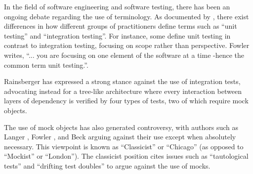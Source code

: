 \documentclass[conference]{IEEEtran}
\begin{document}


In the field of software engineering and software testing, there has been an ongoing debate regarding the use of terminology. As documented by \cite{meszaros2007xunit}, there exist differences in how different groups of practitioners define terms such as ``unit testing'' and ``integration testing''. For instance, some define unit testing in contrast to integration testing, focusing on scope rather than perspective. Fowler \cite{mockarentstubs} writes, ``... you are focusing on one element of the software at a time -hence the common term unit testing.''. 

Rainsberger \cite{intgtestscam} has expressed a strong stance against the use of integration tests, advocating instead for a tree-like architecture where every interaction between layers of dependency is verified by four types of tests, two of which require mock objects. 

The use of mock objects has also generated controversy, with authors such as Langer \cite{langr2004don}, Fowler \cite{mockarentstubs}, and Beck \cite{istdddead} arguing against their use except when absolutely necessary. This viewpoint is known as ``Classicist'' or ``Chicago'' (as opposed to ``Mockist'' or ``London''). The classicist position cites issues such as ``tautological tests'' \cite{tautotest} and ``drifting test doubles'' \cite{whotestcontract} to argue against the use of mocks.
\end{document}
